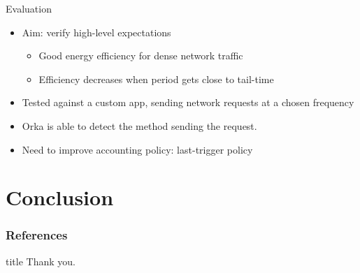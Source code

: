\begin{frame}[fragile]{Evaluation}
\begin{itemize}
\item Aim: verify high-level expectations
\begin{itemize}
\item Good energy efficiency for dense network traffic
\item Efficiency decreases when period gets close to tail-time
\end{itemize}
\item Tested against a custom app, sending network requests at a chosen frequency
\item Orka is able to detect the method sending the request.
\item Need to improve accounting policy: \alert{last-trigger policy}
\end{itemize}
\end{frame}
%
%
%
\section{Conclusion}

%
%
\begin{frame}[allowframebreaks]
        \frametitle{References}
        
        {\footnotesize  }
\end{frame}
%
%
\begin{frame}
  \vfill
  \centering
  \begin{beamercolorbox}[sep=8pt,center,shadow=true,rounded=true]{title}
    Thank you.\par%
  \end{beamercolorbox}
  \vfill
\end{frame}
%
%
